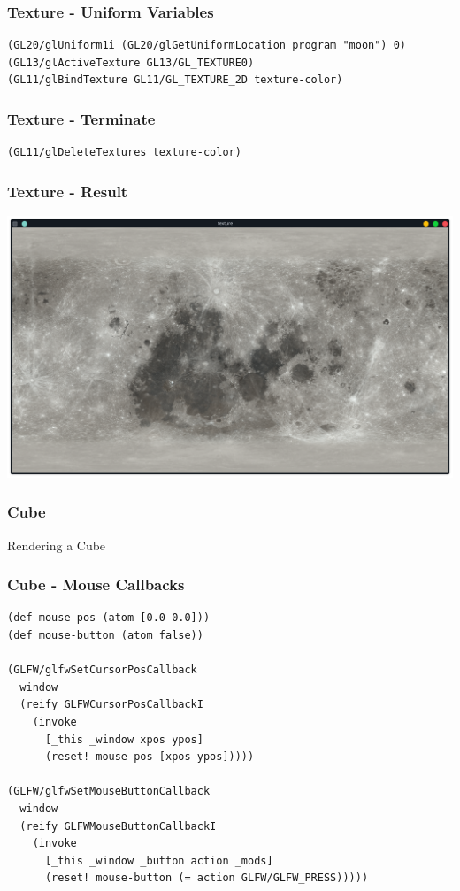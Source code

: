 \documentclass[aspectratio=169,11pt,xcolor=dvipsnames]{beamer}
\begin{document}
\begin{frame}[fragile]
  \frametitle{Texture {-} Uniform Variables}
  \begin{verbatim}
(GL20/glUniform1i (GL20/glGetUniformLocation program "moon") 0)
(GL13/glActiveTexture GL13/GL_TEXTURE0)
(GL11/glBindTexture GL11/GL_TEXTURE_2D texture-color)
  \end{verbatim}
\end{frame}

\begin{frame}[fragile]
  \frametitle{Texture {-} Terminate}
  \begin{verbatim}
(GL11/glDeleteTextures texture-color)
  \end{verbatim}
\end{frame}

\begin{frame}
  \frametitle{Texture {-} Result}
  \begin{center}
    \includegraphics[width=.8\textwidth]{texture}
  \end{center}
\end{frame}

\begin{frame}
  \frametitle{Cube}
  \begin{center}
    \begin{huge}
      Rendering a Cube
    \end{huge}
  \end{center}
\end{frame}

\begin{frame}[fragile]
  \frametitle{Cube {-} Mouse Callbacks}
  \begin{verbatim}
(def mouse-pos (atom [0.0 0.0]))
(def mouse-button (atom false))

(GLFW/glfwSetCursorPosCallback
  window
  (reify GLFWCursorPosCallbackI
    (invoke
      [_this _window xpos ypos]
      (reset! mouse-pos [xpos ypos]))))

(GLFW/glfwSetMouseButtonCallback
  window
  (reify GLFWMouseButtonCallbackI
    (invoke
      [_this _window _button action _mods]
      (reset! mouse-button (= action GLFW/GLFW_PRESS)))))
  \end{verbatim}
\end{frame}
\end{document}
